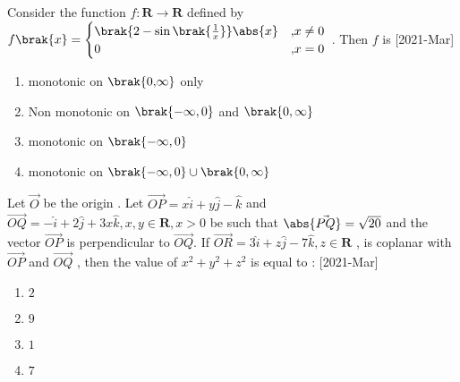     \item Consider the function $ f : \mathbf{R} \rightarrow \mathbf{R}$ defined by $ f\brak{x} = \begin{cases} \brak{2 - \sin{\brak{\frac{1}{x}}}}\abs{x} & \text{,} x \neq 0 \\ 0 & \text{,} x=0 \end{cases}$ . Then $f$ is \hfill[2021-Mar]
        \begin{enumerate}
            \item monotonic on $\brak{ 0 \text{,} \infty}$ only
            \item Non monotonic on $\brak{-\infty , 0}$ and $\brak{0, \infty}$
            \item monotonic on $\brak{-\infty , 0}$
            \item monotonic on $\brak{-\infty , 0} \cup \brak{0 , \infty} $\\
        \end{enumerate}
\item Let $\vec{O}$ be the origin . Let $\vec{OP} = x \hat{i} + y\hat{j} -\hat{k}$ and $\vec{OQ}= -\hat{i} + 2\hat{j} + 3x\hat{k} , x,y \in \mathbf{R} , x >0$ be such that $\abs{\vec{PQ}} = \sqrt{20}$ and the vector $\vec{OP}$ is perpendicular to $\vec{OQ}$. If $\vec{OR} = 3\hat{i} + z\hat{j} - 7\hat{k} , z \in \mathbf{R}$ , is coplanar with $\vec{OP}$ and $\vec{OQ}$ , then the value of $x^2 + y^2 + z^2$ is equal to : \hfill[2021-Mar]
   \begin{multicols}{2}
   \begin{enumerate}
       \item $2$
       \item $9$
       \item $1$
       \item $7$
   \end{enumerate}
   \end{multicols}

